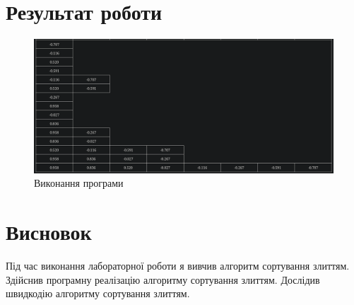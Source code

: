 \documentclass{article}
\begin{document}
\begin{normalsize}
		\section*{Результат роботи}
		\begin{figure}[H]
			\centering
			\includegraphics[scale=0.36]{1}
			\caption{Виконання програми}
		\end{figure}
		
		\section*{Висновок}
		Під час виконання лабораторної роботи я вивчив алгоритм сортування злиттям. Здійснив програмну реалізацію алгоритму сортування злиттям. Дослідив швидкодію алгоритму сортування злиттям.
		
	\end{normalsize}
\end{document}
